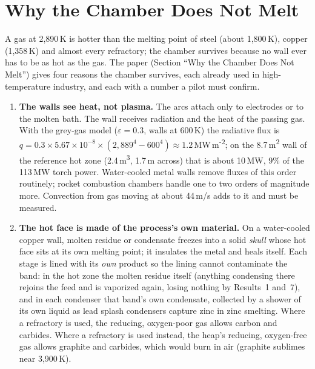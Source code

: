 \documentclass[11pt,a4paper]{article}
\begin{document}
\section{Why the Chamber Does Not Melt}\label{ch:walls}
A gas at 2,890\,K is hotter than the melting point of steel (about 1,800\,K), copper (1,358\,K) and almost every refractory; the chamber survives because no wall ever has to be as hot as the gas. The paper (Section ``Why the Chamber Does Not Melt'') gives four reasons the chamber survives, each already used in high-temperature industry, and each with a number a pilot must confirm.
\begin{enumerate}
\item \textbf{The walls see heat, not plasma.} The arcs attach only to electrodes or to the molten bath. The wall receives radiation and the heat of the passing gas. With the grey-gas model ($\varepsilon = 0.3$, walls at 600\,K) the radiative flux is $q = 0.3\times5.67\times10^{-8}\times(2{,}889^4 - 600^4) \approx 1.2$\,MW\,m\textsuperscript{-2}; on the 8.7\,m\textsuperscript{2} wall of the reference hot zone (2.4\,m\textsuperscript{3}, 1.7\,m across) that is about 10\,MW, 9\% of the 113\,MW torch power. Water-cooled metal walls remove fluxes of this order routinely; rocket combustion chambers handle one to two orders of magnitude more. Convection from gas moving at about 44\,m/s adds to it and must be measured.
\item \textbf{The hot face is made of the process's own material.} On a water-cooled copper wall, molten residue or condensate freezes into a solid \emph{skull} whose hot face sits at its own melting point; it insulates the metal and heals itself. Each stage is lined with its \emph{own} product so the lining cannot contaminate the band: in the hot zone the molten residue itself (anything condensing there rejoins the feed and is vaporized again, losing nothing by Results~1 and~7), and in each condenser that band's own condensate, collected by a shower of its own liquid as lead splash condensers capture zinc in zinc smelting. Where a refractory is used, the reducing, oxygen-poor gas allows carbon and carbides. Where a refractory is used instead, the heap's reducing, oxygen-free gas allows graphite and carbides, which would burn in air (graphite sublimes near 3,900\,K).

\end{enumerate}
\end{document}
